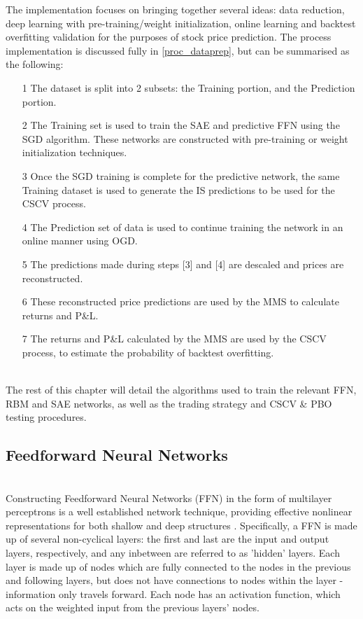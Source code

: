 \documentclass[a4paper,11pt,oneside]{article}
\theoremstyle{plain}
\theoremstyle{definition}
\begin{document}
	
	The implementation focuses on bringing together several ideas: data reduction, deep learning with pre-training/weight initialization, online learning and backtest overfitting validation for the purposes of stock price prediction. The process implementation is discussed fully in \ref{proc_dataprep}, but can be summarised as the following:
	
	\begin{itemize}
		\item [1] The dataset is split into 2 subsets: the Training portion, and the Prediction portion.
		\item [2] The Training set is used to train the SAE and predictive FFN using the SGD algorithm. These networks are constructed with pre-training or weight initialization techniques.
		\item [3] Once the SGD training is complete for the predictive network, the same Training dataset is used to generate the IS predictions to be used for the CSCV process.
		\item [4] The Prediction set of data is used to continue training the network in an online manner using OGD.
		\item [5] The predictions made during steps [3] and [4] are descaled and prices are reconstructed.
		\item [6] These reconstructed price predictions are used by the MMS to calculate returns and P\&L.
		\item [7] The returns and P\&L calculated by the MMS are used by the CSCV process, to estimate the probability of backtest overfitting.
	\end{itemize}
	~\\
	The rest of this chapter will detail the algorithms used to train the relevant FFN, RBM and SAE networks, as well as the trading strategy and CSCV \& PBO testing procedures.
	
	\subsection{Feedforward Neural Networks}\label{imp_ffn}
	~\\
	Constructing Feedforward Neural Networks (FFN) in the form of multilayer perceptrons is a well established network technique, providing effective nonlinear representations for both shallow and deep structures \cite{Schmidhuber}. Specifically, a FFN is made up of several non-cyclical layers: the first and last are the input and output layers, respectively, and any inbetween are referred to as 'hidden' layers. Each layer is made up of nodes which are fully connected to the nodes in the previous and following layers, but does not have connections to nodes within the layer - information only travels forward. Each 
	node has an activation function, which acts on the weighted input from the previous layers' nodes.
	
\end{document}
